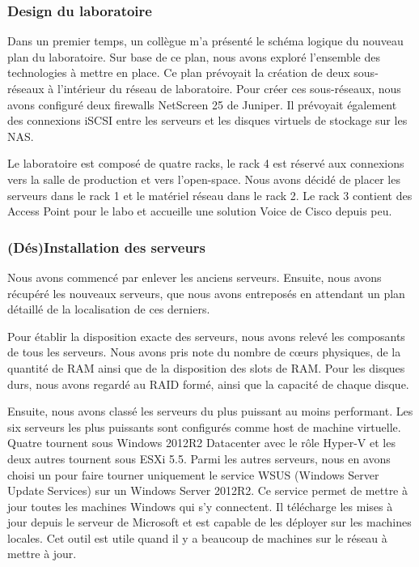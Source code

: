 \subsubsection{Design du laboratoire}
Dans un premier temps, un collègue m'a présenté le schéma logique du nouveau plan du laboratoire.
Sur base de ce plan, nous avons exploré l'ensemble des technologies à mettre en place.
Ce plan prévoyait la création de deux sous-réseaux à l'intérieur du réseau de laboratoire.
Pour créer ces sous-réseaux, nous avons configuré deux firewalls NetScreen 25 de Juniper. 
Il prévoyait également des connexions iSCSI entre les serveurs et les disques virtuels de stockage sur les NAS.

Le laboratoire est composé de quatre racks, le rack 4 est réservé aux connexions vers la salle de production et vers l'open-space.
Nous avons décidé de placer les serveurs dans le rack 1 et le matériel réseau dans le rack 2.
Le rack 3 contient des Access Point pour le labo et accueille une solution Voice de Cisco depuis peu.

\subsubsection{(Dés)Installation des serveurs}
Nous avons commencé par enlever les anciens serveurs.
Ensuite, nous avons récupéré les nouveaux serveurs, que nous avons entreposés en attendant un plan détaillé de la localisation de ces derniers.

Pour établir la disposition exacte des serveurs, nous avons relevé les composants de tous les serveurs.
Nous avons pris note du nombre de cœurs physiques, de la quantité de RAM ainsi que de la disposition des slots de RAM.
Pour les disques durs, nous avons regardé au RAID formé, ainsi que la capacité de chaque disque.

Ensuite, nous avons classé les serveurs du plus puissant au moins performant. 
Les six serveurs les plus puissants sont configurés comme host de machine virtuelle. 
Quatre tournent sous Windows 2012R2 Datacenter avec le rôle Hyper-V et les deux autres tournent sous ESXi 5.5.
Parmi les autres serveurs, nous en avons choisi un pour faire tourner uniquement le service WSUS (Windows Server Update Services) sur un Windows Server 2012R2. 
Ce service permet de mettre à jour toutes les machines Windows qui s'y connectent.
Il télécharge les mises à jour depuis le serveur de Microsoft et est capable de les déployer sur les machines locales.
Cet outil est utile quand il y a beaucoup de machines sur le réseau à mettre à jour. 

